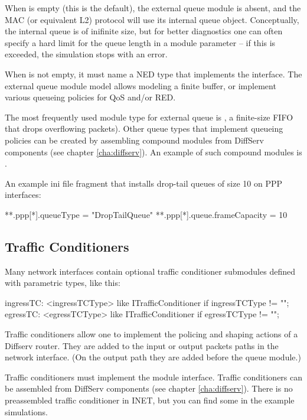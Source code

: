 When  is empty (this is the default), the external queue 
module is absent, and the MAC (or equivalent L2) protocol will use its 
internal queue object. Conceptually, the internal queue is of inifinite size, 
but for better diagnostics one can often specify a hard limit for the queue
length in a module parameter -- if this is exceeded, the simulation 
stops with an error.

When  is not empty, it must name a NED type that 
implements the  interface. The external 
queue module model allows modeling a finite buffer, or implement
various queueing policies for QoS and/or RED.

The most frequently used module type for external queue is 
, a finite-size FIFO that drops overflowing 
packets). Other queue types that implement queueing policies can be 
created by assembling compound modules from DiffServ components 
(see chapter \ref{cha:diffserv}). An example of such compound
modules is .

An example ini file fragment that installs drop-tail queues of size 10
on PPP interfaces:

\begin{inifile}
**.ppp[*].queueType = "DropTailQueue"
**.ppp[*].queue.frameCapacity = 10
\end{inifile}

\subsection{Traffic Conditioners}

Many network interfaces contain optional traffic conditioner submodules
defined with parametric types, like this: 

\begin{ned}
ingressTC: <ingressTCType> like ITrafficConditioner if ingressTCType != "";
egressTC: <egressTCType> like ITrafficConditioner if egressTCType != "";
\end{ned}

Traffic conditioners allow one to implement the policing and shaping actions
of a Diffserv router. They are added to the input or output packets paths  
in the network interface. (On the output path they are added before the queue 
module.) 

Traffic conditioners must implement the  module
interface. Traffic conditioners can be assembled from DiffServ components 
(see chapter \ref{cha:diffserv}). There is no preassembled traffic conditioner
in INET, but you can find some in the example simulations.

